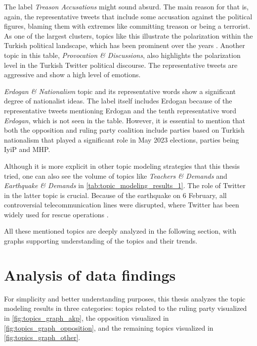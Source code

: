 The label \textit{Treason Accusations} might sound absurd. The main reason for that is, again, 
the representative tweets that include some accusation against the political figures, 
blaming them with extremes like committing treason or being a terrorist. As one of the largest 
clusters, topics like this illustrate the polarization within the Turkish political landscape, 
which has been prominent over the years \parencite{cevik_turkey_polarization_2018}. 
Another topic in this table, \textit{Provocation \& Discussions}, also highlights the 
polarization level in the Turkish Twitter political discourse. The representative tweets are 
aggressive and show a high level of emotions.

\textit{Erdogan \& Nationalism} topic and its representative words show a significant degree 
of nationalist ideas. The label itself includes Erdogan because of the representative tweets 
mentioning Erdogan and the tenth representative word \textit{Erdogan}, which is not seen in the table. 
However, it is essential to mention that both the opposition and ruling party coalition 
include parties based on Turkish nationalism that played a significant role in May 2023 
elections, parties being \ac{IyiP} and \ac{MHP}.

Although it is more explicit in other topic modeling strategies that this thesis tried, 
one can also see the volume of topics like \textit{Teachers \& Demands} and \textit{Earthquake \& Demands} 
in \autoref{tab:topic_modeling_results_1}. The role of Twitter in the latter topic is crucial. 
Because of the earthquake on 6 February, all controversial telecommunication lines were disrupted, 
where Twitter has been widely used for rescue operations \parencite{cevik_aksoy_turkey_earthquake_2023}.

All these mentioned topics are deeply analyzed in the following section, with 
graphs supporting understanding of the topics and their trends.

\section{Analysis of data findings}

For simplicity and better understanding purposes, this thesis analyzes the topic modeling results 
in three categories: topics related to the ruling party visualized in \autoref{fig:topics_graph_akp}, 
the opposition visualized in \autoref{fig:topics_graph_opposition}, and the remaining topics 
visualized in \autoref{fig:topics_graph_other}. 

